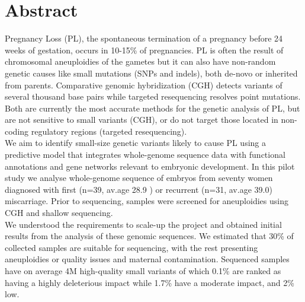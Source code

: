 
\chapter{Abstract}
    

\label{Chapter0} %


\newcommand{\keyword}[1]{\textbf{#1}}
\newcommand{\tabhead}[1]{\textbf{#1}}
\newcommand{\code}[1]{\texttt{#1}}
\newcommand{\file}[1]{\texttt{\bfseries#1}}
\newcommand{\option}[1]{\texttt{\itshape#1}}





 Pregnancy Loss (PL), the spontaneous termination of a pregnancy before 24 weeks of gestation, occurs in 10-15\% of pregnancies. PL is often the result of chromosomal aneuploidies of the gametes but it can also have non-random genetic causes like small mutations (SNPs and indels), both de-novo or inherited from parents. Comparative genomic hybridization (CGH) detects variants of several thousand base pairs while targeted resequencing resolves point mutations. Both are currently the most accurate methods for the genetic analysis of PL, but are not sensitive to small variants (CGH), or do not target those located in non-coding regulatory regions (targeted resequencing). \\

\noindent
We aim to identify small-size genetic variants likely to cause PL using a predictive model that integrates whole-genome sequence data with functional annotations and gene networks relevant to embryonic development. In this pilot study we analyse whole-genome sequence of embryos from seventy women diagnosed with first (n=39, av.age 28.9 ) or recurrent (n=31, av.age 39.0) miscarriage. Prior to sequencing, samples were screened for aneuploidies using CGH and shallow sequencing. \\

\noindent
We understood the requirements to scale-up the project and obtained initial results from the analysis of these genomic sequences. We estimated that 30\% of collected samples are suitable for sequencing, with the rest presenting aneuploidies or quality issues and maternal contamination. Sequenced samples have on average 4M high-quality small variants of which 0.1\% are ranked as having a highly deleterious impact while 1.7\% have a moderate impact, and 2\% low. \\

